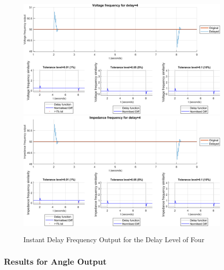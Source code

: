 \begin{figure}
    \caption{Instant Delay Frequency Output for the Delay Level of Four}
    \includegraphics[width=0.95\textwidth]{PMUsim-figures/DelayOf_4/Instant_vFrequency.png}    
    \label{fig:PMUsim_Four_vFrequency}
    \includegraphics[width=0.95\textwidth]{PMUsim-figures/DelayOf_4/Instant_iFrequency.png}    
    \label{fig:PMUsim_Four_Frequency}
        \begin{small}
     \end{small}
\end{figure}


\newpage \subsubsection{Results for Angle Output}


